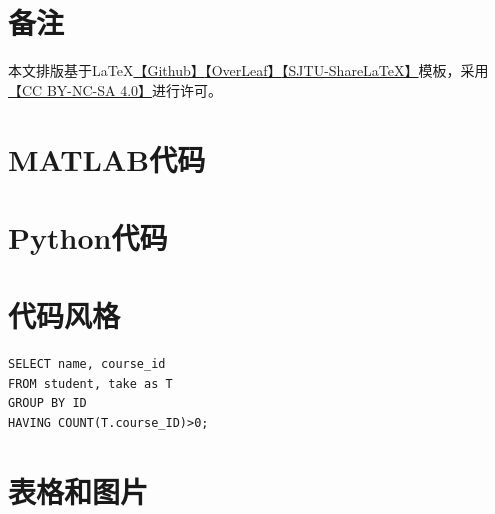 \documentclass[a4paper]{article}
\begin{document}
\newpage


\newpage
\section*{备注}
本文排版基于\LaTeX{}\href{https://github.com/JamesZhutheThird/A-Simple-LaTeX-Template}{【Github】}\href{https://cn.overleaf.com/read/mxmypkyfrzpz}{【OverLeaf】}\href{https://latex.sjtu.edu.cn/read/ndjrkpksrfzn}{【SJTU-ShareLaTeX】}模板，采用\href{http://creativecommons.org/licenses/by-nc-sa/4.0/}{【CC BY-NC-SA 4.0】}进行许可。





\appendix

\section{MATLAB代码}
\label{appcode:demo1}


\section{Python代码}
\label{appcode:demo2}


\section{代码风格}
\label{appcode:demo3}
\lstset{style=SQLStyle}
\begin{lstlisting}
SELECT name, course_id
FROM student, take as T
GROUP BY ID
HAVING COUNT(T.course_ID)>0;
\end{lstlisting}







\lstset{style=matlabStyle}


\lstset{style=matlabStyle}


\section{表格和图片}
\setcounter{table}{0}   
\setcounter{figure}{0}
\renewcommand{\thetable}{B\arabic{table}}
\renewcommand{\thefigure}{B\arabic{figure}}
\end{document}
